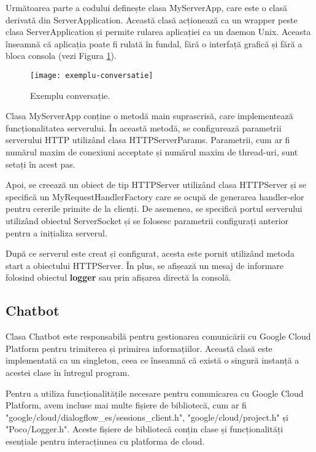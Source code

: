 Următoarea parte a codului definește clasa MyServerApp, care este o clasă derivată din ServerApplication. Această clasă acționează ca un wrapper peste clasa ServerApplication și permite rularea aplicației ca un daemon Unix. Aceasta înseamnă că aplicația poate fi rulată în fundal, fără o interfață grafică și fără a bloca consola (vezi Figura \ref{fig:exempluConversatie}).

\begin{figure}[h]
    \centering
    \texttt{[image: exemplu-conversatie]}
    \caption{Exemplu conversație.}
    \label{fig:exempluConversatie}
\end{figure}

Clasa MyServerApp conține o metodă main suprascrisă, care implementează funcționalitatea serverului. În această metodă, se configurează parametrii serverului HTTP utilizând clasa HTTPServerParams. Parametrii, cum ar fi numărul maxim de conexiuni acceptate și numărul maxim de thread-uri, sunt setați în acest pas.

Apoi, se creează un obiect de tip HTTPServer utilizând clasa HTTPServer și se specifică un MyRequestHandlerFactory care se ocupă de generarea handler-elor pentru cererile primite de la clienți. De asemenea, se specifică portul serverului utilizând obiectul ServerSocket și se folosesc parametrii configurați anterior pentru a inițializa serverul.

După ce serverul este creat și configurat, acesta este pornit utilizând metoda start a obiectului HTTPServer. În plus, se afișează un mesaj de informare folosind obiectul \textbf{logger} sau prin afișarea directă la consolă.

\subsection{Chatbot}

Clasa Chatbot este responsabilă pentru gestionarea comunicării cu Google Cloud Platform pentru trimiterea și primirea informațiilor. Această clasă este implementată ca un singleton, ceea ce înseamnă că există o singură instanță a acestei clase în întregul program.

Pentru a utiliza funcționalitățile necesare pentru comunicarea cu Google Cloud Platform, avem incluse mai multe fișiere de bibliotecă, cum ar fi "google/cloud/dialogflow\_es/sessions\_client.h", "google/cloud/project.h" și "Poco/Logger.h". Aceste fișiere de bibliotecă conțin clase și funcționalități esențiale pentru interacțiunea cu platforma de cloud.

